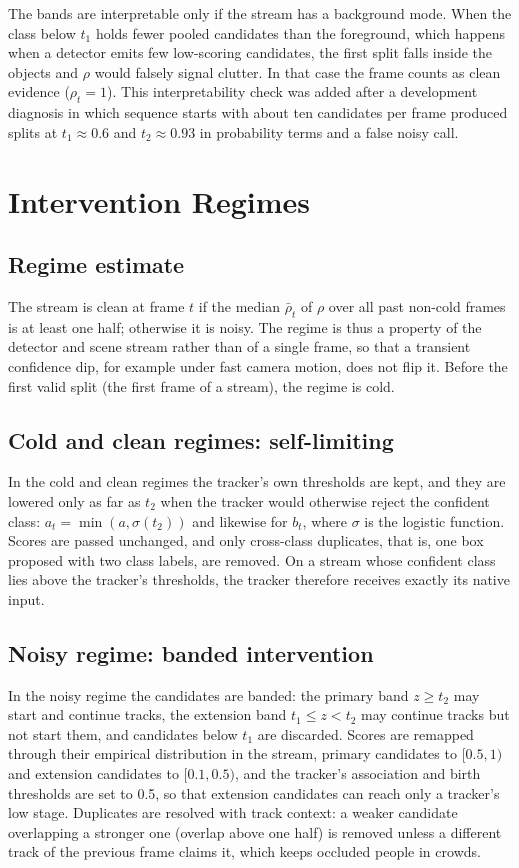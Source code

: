 \documentclass[journal]{new-aiaa}
\begin{document}
The bands are interpretable only if the stream has a background mode. When the class below $t_1$ holds fewer pooled candidates than the foreground, which happens when a detector emits few low-scoring candidates, the first split falls inside the objects and $\rho$ would falsely signal clutter. In that case the frame counts as clean evidence ($\rho_t=1$). This interpretability check was added after a development diagnosis in which sequence starts with about ten candidates per frame produced splits at $t_1\approx0.6$ and $t_2\approx0.93$ in probability terms and a false noisy call.

\section{Intervention Regimes}\label{sec:regimes}

\subsection{Regime estimate}
The stream is clean at frame $t$ if the median $\bar\rho_t$ of $\rho$ over all past non-cold frames is at least one half; otherwise it is noisy. The regime is thus a property of the detector and scene stream rather than of a single frame, so that a transient confidence dip, for example under fast camera motion, does not flip it. Before the first valid split (the first frame of a stream), the regime is cold.

\subsection{Cold and clean regimes: self-limiting}
In the cold and clean regimes the tracker's own thresholds are kept, and they are lowered only as far as $t_2$ when the tracker would otherwise reject the confident class: $a_t=\min(a, \sigma(t_2))$ and likewise for $b_t$, where $\sigma$ is the logistic function. Scores are passed unchanged, and only cross-class duplicates, that is, one box proposed with two class labels, are removed. On a stream whose confident class lies above the tracker's thresholds, the tracker therefore receives exactly its native input.

\subsection{Noisy regime: banded intervention}
In the noisy regime the candidates are banded: the primary band $z\ge t_2$ may start and continue tracks, the extension band $t_1\le z<t_2$ may continue tracks but not start them, and candidates below $t_1$ are discarded. Scores are remapped through their empirical distribution in the stream, primary candidates to $[0.5,1)$ and extension candidates to $[0.1,0.5)$, and the tracker's association and birth thresholds are set to 0.5, so that extension candidates can reach only a tracker's low stage. Duplicates are resolved with track context: a weaker candidate overlapping a stronger one (overlap above one half) is removed unless a different track of the previous frame claims it, which keeps occluded people in crowds.
\end{document}
